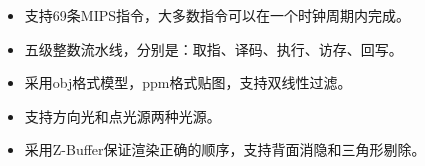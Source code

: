 \documentclass{resume}
\begin{document}
\begin{itemize}
  \item 支持69条MIPS指令，大多数指令可以在一个时钟周期内完成。
  \item 五级整数流水线，分别是：取指、译码、执行、访存、回写。
\end{itemize}


\begin{itemize}
  \item 采用obj格式模型，ppm格式贴图，支持双线性过滤。
  \item 支持方向光和点光源两种光源。
  \item 采用Z-Buffer保证渲染正确的顺序，支持背面消隐和三角形剔除。
\end{itemize}



%
%
\end{document}
